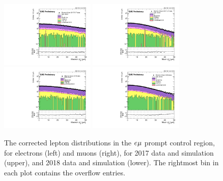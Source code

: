 \begin{figure}
\centering
\includegraphics[width=0.4\textwidth]{figures/corrections/d0_smearing/emu_2017/electronAbsD0_50um.pdf} 
\includegraphics[width=0.4\textwidth]{figures/corrections/d0_smearing/emu_2017/muonAbsD0_50um.pdf}
\includegraphics[width=0.4\textwidth]{figures/corrections/d0_smearing/emu_2018/electronAbsD0_50um.pdf} 
\includegraphics[width=0.4\textwidth]{figures/corrections/d0_smearing/emu_2018/muonAbsD0_50um.pdf}
\caption{The corrected lepton \ad distributions in the $e{\mu}$ prompt control region, for electrons (left) and muons (right), for 2017 data and simulation (upper), and 2018 data and simulation (lower). The rightmost bin in each plot
contains the overflow entries.}
\label{corrected_d0}
\end{figure}